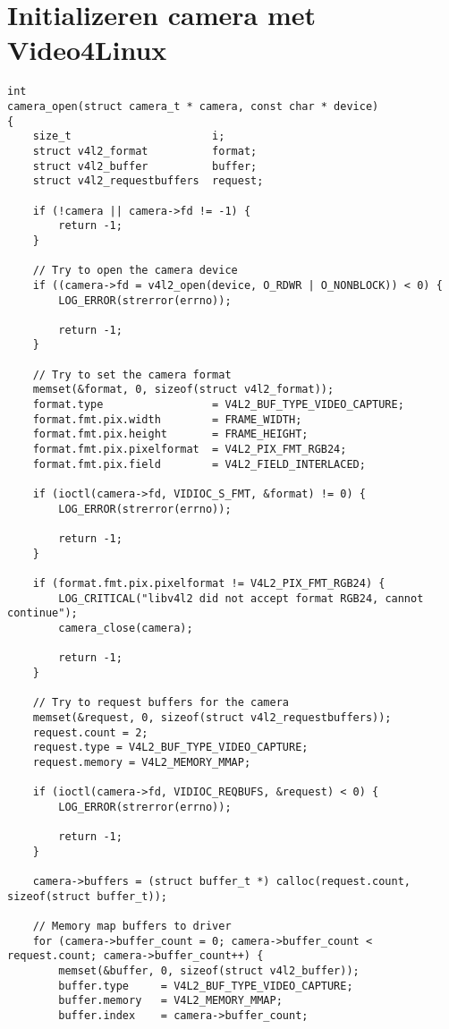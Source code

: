 \chapter{Initializeren camera met Video4Linux}
\label{app:camera-init}

\begin{verbatim}
int
camera_open(struct camera_t * camera, const char * device)
{
    size_t                      i;
    struct v4l2_format          format;
    struct v4l2_buffer          buffer;
    struct v4l2_requestbuffers  request;

    if (!camera || camera->fd != -1) {
        return -1;
    }

    // Try to open the camera device
    if ((camera->fd = v4l2_open(device, O_RDWR | O_NONBLOCK)) < 0) {
        LOG_ERROR(strerror(errno));

        return -1;
    }

    // Try to set the camera format
    memset(&format, 0, sizeof(struct v4l2_format));
    format.type                 = V4L2_BUF_TYPE_VIDEO_CAPTURE;
    format.fmt.pix.width        = FRAME_WIDTH;
    format.fmt.pix.height       = FRAME_HEIGHT;
    format.fmt.pix.pixelformat  = V4L2_PIX_FMT_RGB24;
    format.fmt.pix.field        = V4L2_FIELD_INTERLACED;

    if (ioctl(camera->fd, VIDIOC_S_FMT, &format) != 0) {
        LOG_ERROR(strerror(errno));

        return -1;
    }

    if (format.fmt.pix.pixelformat != V4L2_PIX_FMT_RGB24) {
        LOG_CRITICAL("libv4l2 did not accept format RGB24, cannot continue");
        camera_close(camera);

        return -1;
    }

    // Try to request buffers for the camera
    memset(&request, 0, sizeof(struct v4l2_requestbuffers));
    request.count = 2;
    request.type = V4L2_BUF_TYPE_VIDEO_CAPTURE;
    request.memory = V4L2_MEMORY_MMAP;

    if (ioctl(camera->fd, VIDIOC_REQBUFS, &request) < 0) {
        LOG_ERROR(strerror(errno));

        return -1;
    }

    camera->buffers = (struct buffer_t *) calloc(request.count, sizeof(struct buffer_t));

    // Memory map buffers to driver
    for (camera->buffer_count = 0; camera->buffer_count < request.count; camera->buffer_count++) {
        memset(&buffer, 0, sizeof(struct v4l2_buffer));
        buffer.type     = V4L2_BUF_TYPE_VIDEO_CAPTURE;
        buffer.memory   = V4L2_MEMORY_MMAP;
        buffer.index    = camera->buffer_count;


\end{verbatim}
